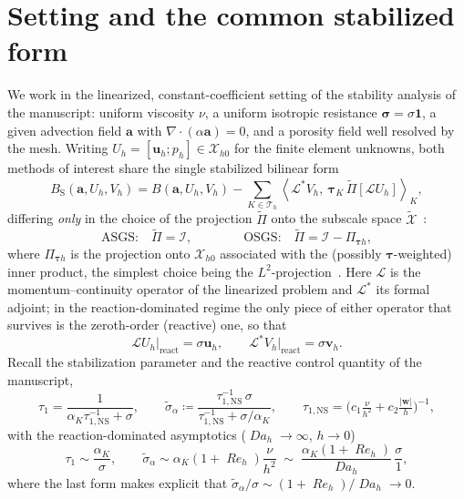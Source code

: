 \documentclass[11pt]{article}
\newcommand{\Reyn}{\operatorname{\mathit{Re}}}
\newcommand{\Damk}{\operatorname{\mathit{Da}}}
\newcommand{\dualpairing}[1]{\left\langle #1\right\rangle}
\theoremstyle{plain}
\theoremstyle{remark}
\newcommand{\uh}{\boldsymbol{u}_h}
\newcommand{\ph}{p_h}
\newcommand{\Uh}{U_h}
\newcommand{\Vh}{V_h}
\newcommand{\Th}{\mathcal{T}_h}
\newcommand{\Xh}{\mathcal{X}_{h0}}
\newcommand{\Pio}{\Pi_{\boldsymbol{\tau}h}}            %
\newcommand{\Porth}{\widetilde{\Pi}}                  %
\newcommand{\siga}{\widetilde{\sigma}_\alpha}
\newcommand{\tauNS}{\tau_{1,\text{NS}}}
\begin{document}
\section{Setting and the common stabilized form}
We work in the linearized, constant-coefficient setting of the stability analysis
of the manuscript: uniform viscosity $\nu$, a uniform isotropic resistance
$\boldsymbol{\sigma}=\sigma\boldsymbol{1}$, a given advection field $\boldsymbol{a}$
with $\nabla\!\cdot(\alpha\boldsymbol{a})=0$, and a porosity field well resolved by
the mesh. Writing $\Uh=[\uh;\ph]\in\Xh$ for the finite element unknowns, both
methods of interest share the single stabilized bilinear form
%
\begin{equation}\label{eq:BS}
  B_\text{S}(\boldsymbol{a},\Uh,\Vh)
  = B(\boldsymbol{a},\Uh,\Vh)
  - \sum_{K\in\Th}\dualpairing{\mathcal{L}^*\Vh,\ \boldsymbol{\tau}_K\,\Porth\!\left[\mathcal{L}\Uh\right]}_K ,
\end{equation}
%
differing \emph{only} in the choice of the projection $\Porth$ onto the subscale
space $\widetilde{\mathcal{X}}$~\cite{codina2018variational,hughes2007variational}:
%
\begin{equation}\label{eq:choices}
  \text{ASGS:}\quad \Porth=\mathcal{I},
  \qquad\qquad
  \text{OSGS:}\quad \Porth=\mathcal{I}-\Pio ,
\end{equation}
%
where $\Pio$ is the projection onto $\Xh$ associated with the (possibly
$\boldsymbol{\tau}$-weighted) inner product, the simplest choice being the
$L^2$-projection~\cite{codina2002stabilized}. Here $\mathcal{L}$ is the
momentum--continuity operator of the linearized problem and $\mathcal{L}^*$ its
formal adjoint; in the reaction-dominated regime the only piece of either operator
that survives is the zeroth-order (reactive) one, so that
%
\begin{equation}\label{eq:reactive-part}
  \mathcal{L}\Uh\big|_{\text{react}} = \sigma\uh,
  \qquad
  \mathcal{L}^*\Vh\big|_{\text{react}} = \sigma\boldsymbol{v}_h .
\end{equation}
%
Recall the stabilization parameter and the reactive control quantity of the
manuscript,
%
\begin{equation}\label{eq:tau1-siga}
  \tau_1=\frac{1}{\alpha_K\tauNS^{-1}+\sigma},
  \qquad
  \siga\coloneqq\frac{\tauNS^{-1}\,\sigma}{\tauNS^{-1}+\sigma/\alpha_K},
  \qquad
  \tauNS=\Big(c_1\tfrac{\nu}{h^2}+c_2\tfrac{|\boldsymbol{w}|}{h}\Big)^{-1},
\end{equation}
%
with the reaction-dominated asymptotics ($\Damk_h\to\infty$, $h\to0$)
%
\begin{equation}\label{eq:asymp}
  \tau_1\sim\frac{\alpha_K}{\sigma},
  \qquad
  \siga\sim\alpha_K(1+\Reyn_h)\frac{\nu}{h^2}
  \;\sim\;\frac{\alpha_K(1+\Reyn_h)}{\Damk_h}\,\frac{\sigma}{1},
\end{equation}
%
where the last form makes explicit that $\siga/\sigma\sim(1+\Reyn_h)/\Damk_h\to0$.
\end{document}
